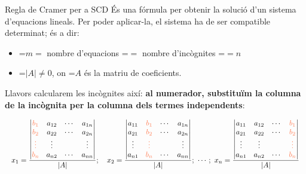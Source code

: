\documentclass[11pt,a4paper]{article}
\newcommand{\fmm}[1]{\setbox0=\hbox{$#1$}\ifdim\wd0>\linewidth\fmdisp{#1}\else\mbox{\box0}\fi}
\newcommand{\fmdisp}[1]{\[\setbox2=\hbox{$\displaystyle #1$}\ifdim\wd2>\linewidth\resizebox{\linewidth}{!}{\box2}\else\box2\fi\]}
\begin{document}
\begin{fmdef}{Regla de Cramer per a SCD}
És una fórmula per obtenir la solució d'un sistema d'equacions lineals. Per poder aplicar-la, el sistema ha de ser compatible determinat; és a dir:

\begin{itemize}
\item \fmm{m=} nombre d'equacions \fmm{=} nombre d'incògnites \fmm{=n}
\item \fmm{|A|\neq0}, on \fmm{A} és la matriu de coeficients.
\end{itemize}

Llavors calcularem les incògnites així: \textbf{al numerador, substituïm la columna de la incògnita per la columna dels termes independents}:

\fmdisp{x_1=\frac{\begin{vmatrix}\color[HTML]{ff7a50}b_1 & a_{12} & \cdots & a_{1n}\\ \color[HTML]{ff7a50}b_2 & a_{22} & \cdots & a_{2n}\\ \color[HTML]{ff7a50}\vdots & \vdots & & \vdots\\ \color[HTML]{ff7a50}b_n & a_{n2} & \cdots & a_{nn}\end{vmatrix}}{|A|};\quad x_2=\frac{\begin{vmatrix}a_{11} & \color[HTML]{ff7a50}b_1 & \cdots & a_{1n}\\ a_{21} & \color[HTML]{ff7a50}b_2 & \cdots & a_{2n}\\ \vdots & \color[HTML]{ff7a50}\vdots & & \vdots\\ a_{n1} & \color[HTML]{ff7a50}b_n & \cdots & a_{nn}\end{vmatrix}}{|A|};\ \cdots;\ x_n=\frac{\begin{vmatrix}a_{11} & a_{12} & \cdots & \color[HTML]{ff7a50}b_1\\ a_{21} & a_{22} & \cdots & \color[HTML]{ff7a50}b_2\\ \vdots & \vdots & & \color[HTML]{ff7a50}\vdots\\ a_{n1} & a_{n2} & \cdots & \color[HTML]{ff7a50}b_n\end{vmatrix}}{|A|}}

\end{fmdef}
\end{document}
